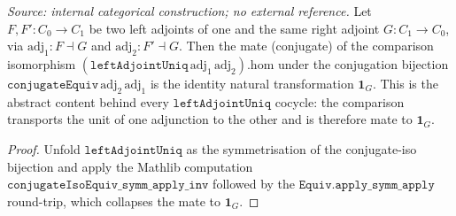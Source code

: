 \begin{lemma}\label{mk-lem:conjugate_equiv_leftadjointuniq_hom}
  \leanok

  \textit{Source: internal categorical construction; no external reference.}
  Let \(F, F' : C_0 \to C_1\) be two left adjoints of one and the same right adjoint
  \(G : C_1 \to C_0\), via \(\mathrm{adj}_1 : F \dashv G\) and \(\mathrm{adj}_2 : F' \dashv G\). Then the
  mate (conjugate) of the comparison isomorphism \((\mathtt{leftAdjointUniq}\,\mathrm{adj}_1\,\mathrm{adj}_2).\mathrm{hom}\)
  under the conjugation bijection \(\mathtt{conjugateEquiv}\,\mathrm{adj}_2\,\mathrm{adj}_1\) is the identity
  natural transformation \(\mathbf{1}_G\). This is the abstract content behind every
  \(\mathtt{leftAdjointUniq}\) cocycle: the comparison transports the unit of one adjunction to the
  other and is therefore mate to \(\mathbf{1}_G\).
\end{lemma}
\begin{proof}
  \leanok


Unfold \(\mathtt{leftAdjointUniq}\) as the symmetrisation of the conjugate-iso bijection and apply the
  Mathlib computation \(\mathtt{conjugateIsoEquiv\_symm\_apply\_inv}\) followed by the
  \(\mathtt{Equiv.apply\_symm\_apply}\) round-trip, which collapses the mate to \(\mathbf{1}_G\).
\end{proof}

